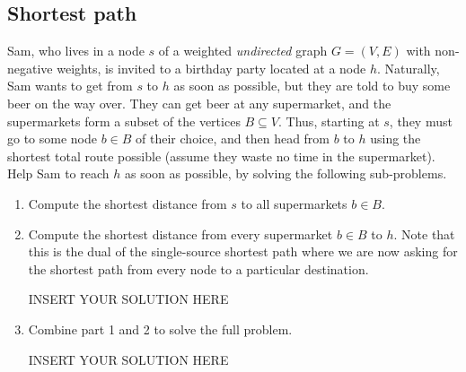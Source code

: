 \newpage
\subsection{Shortest path}
\label{question:birthdayparty}
Sam, who lives in a node $s$ of a weighted \emph{undirected} graph $G = (V, E)$ with non-negative weights, is invited to a birthday party located at a node $h$. Naturally, Sam wants to get from $s$ to $h$ as soon as possible, but they are told to buy some beer on the way over. They can get beer at any supermarket, and the supermarkets form a subset of the vertices $B \subseteq V$. Thus, starting at $s$, they must go to some node $b \in B$ of their choice, and then head from $b$ to $h$ using the shortest total route possible (assume they waste no time in the supermarket). Help Sam to reach $h$ as soon as possible, by solving the following sub-problems. 

\begin{enumerate}
\item Compute the shortest distance from $s$ to all supermarkets $b \in B$.
\begin{solution}

\end{solution}
\item Compute the shortest distance from every supermarket $b \in B$ to $h$. Note that this is the dual of the single-source shortest path where we are now asking for the shortest path from every node to a particular destination. 
\begin{solution}   INSERT YOUR SOLUTION HERE   \end{solution}
    \item Combine part 1 and 2 to solve the full problem.
\begin{solution}   INSERT YOUR SOLUTION HERE   \end{solution}
\end{enumerate}
\newpage
